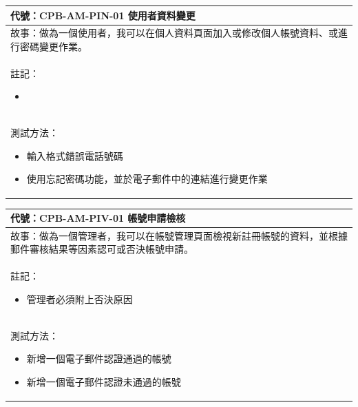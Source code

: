 \documentclass{article}
\begin{document}
\begin{table}[H]
	\begin{tabular}{| m{13cm} |}
		\hline
		代號：CPB-AM-PIN-01	使用者資料變更                    \\ \hline
		故事：做為一個使用者，我可以在個人資料頁面加入或修改個人帳號資料、或進行密碼變更作業。 \\	\hline
		註記：
		\begin{itemize}
			\item
		\end{itemize}                              \\ \hline
		測試方法：
		\begin{itemize}
			\item 輸入格式錯誤電話號碼
			\item 使用忘記密碼功能，並於電子郵件中的連結進行變更作業
		\end{itemize}
		\\	\hline
	\end{tabular}
\end{table}

\begin{table}[H]
	\begin{tabular}{| m{13cm} |}
		\hline
		代號：CPB-AM-PIV-01	帳號申請檢核                                \\ \hline
		故事：做為一個管理者，我可以在帳號管理頁面檢視新註冊帳號的資料，並根據郵件審核結果等因素認可或否決帳號申請。 \\	\hline
		註記：
		\begin{itemize}
			\item 管理者必須附上否決原因
		\end{itemize}                                       \\ \hline
		測試方法：
		\begin{itemize}
			\item 新增一個電子郵件認證通過的帳號
			\item 新增一個電子郵件認證未通過的帳號
		\end{itemize}
		\\	\hline
	\end{tabular}
\end{table}
\end{document}
